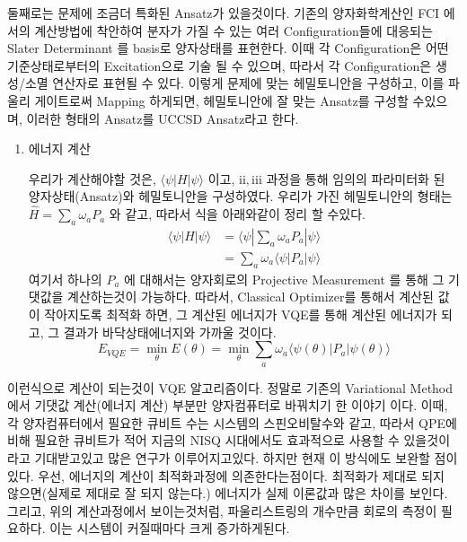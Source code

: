 \documentclass[11pt]{article}
\begin{document}
\begin{enumerate}[label=3)]
\begin{enumerate}[label=\(\mathrm{ii}\))]
둘째로는 문제에 조금더 특화된 Ansatz가 있을것이다. 기존의 양자화학계산인 FCI 에서의 계산방법에 착안하여
분자가 가질 수 있는 여러 Configuration들에 대응되는 Slater Determinant 를 basis로 양자상태를 표현한다. 
이때 각 Configuration은 어떤 기준상태로부터의 Excitation으로 기술 될 수 있으며, 따라서 각 Configuration은 생성/소멸 연산자로 표현될 수 있다. 
이렇게 문제에 맞는 헤밀토니안을 구성하고, 이를 파울리 게이트로써 Mapping 하게되면, 헤밀토니안에 잘 맞는 Ansatz를 구성할 수있으며, 이러한 형태의 Ansatz를 UCCSD Ansatz라고 한다. 
\end{enumerate}

\begin{enumerate}[label=\(\mathrm{iii}\))]
\item {에너지 계산}

우리가 계산해야할 것은, \(\langle \psi|H|\psi \rangle\) 이고, \(\mathrm{ii}, \mathrm{iii}\) 과정을 통해 임의의 파라미터화 된 양자상태(Ansatz)와 헤밀토니안을 구성하였다. 
우리가 가진 헤밀토니안의 형태는 \(\hat{H} = \sum_{a} \omega_a P_a\) 와 같고, 따라서 식을 아래와같이 정리 할 수있다. 
\begin{align*}
\langle \psi|H|\psi \rangle &= \langle \psi|\sum_{a} \omega_a P_a|\psi \rangle \\
&=\sum_{a} \omega_a \langle \psi|P_a|\psi \rangle
\end{align*}
여기서 하나의 \(P_a\) 에 대해서는 양자회로의 Projective Measurement 를 통해 그 기댓값을 계산하는것이 가능하다. 
따라서, Classical Optimizer를 통해서 계산된 값이 작아지도록 최적화 하면, 그 계산된 에너지가 VQE를 통해 계산된 에너지가 되고, 그 결과가 바닥상태에너지와 가까울 것이다.
\[
E_{VQE} =\min_\theta E(\theta) = \min_\theta \sum_{a} \omega_a \langle \psi(\theta)|P_a|\psi(\theta)\rangle
\]

\end{enumerate}
이런식으로 계산이 되는것이 VQE 알고리즘이다. 정말로 기존의 Variational Method 에서 기댓값 계산(에너지 계산) 부분만 양자컴퓨터로 바꿔치기 한 이야기 이다. 
이때, 각 양자컴퓨터에서 필요한 큐비트 수는 시스템의 스핀오비탈수와 같고, 따라서 QPE에 비해 필요한 큐비트가 적어 지금의 NISQ 시대에서도 효과적으로 사용할 수 있을것이라고 기대받고있고 많은 연구가 이루어지고있다. 
하지만 현재 이 방식에도 보완할 점이 있다. 우선, 에너지의 계산이 최적화과정에 의존한다는점이다. 최적화가 제대로 되지 않으면(실제로 제대로 잘 되지 않는다.) 에너지가 실제 이론값과 많은 차이를 보인다. 그리고, 위의 계산과정에서 보이는것처럼,
파울리스트링의 개수만큼 회로의 측정이 필요하다. 이는 시스템이 커질때마다 크게 증가하게된다. 


\end{enumerate}
\end{document}

